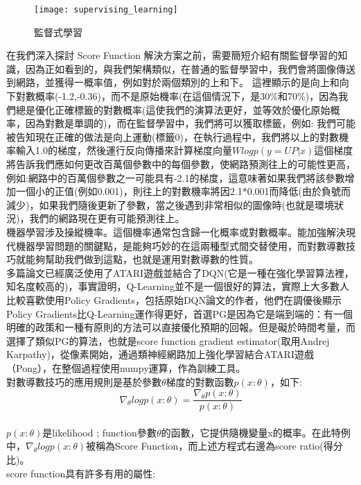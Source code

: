 \begin{figure}[hbt!]
\begin{center}
\texttt{[image: supervising\_learning]}
\caption{監督式學習}
\end{center}
\end{figure}

 在我們深入探討 Score Function 解決方案之前，需要簡短介紹有關監督學習的知識，因為正如看到的，與我們架構類似，在普通的監督學習中，我們會將圖像傳送到網路，並獲得一概率值，例如對於兩個類別的上和下。 這裡顯示的是向上和向下對數概率(-1.2,-0.36)，而不是原始機率(在這個情況下，是30$\%$和70$\%$)，因為我們總是優化正確標籤的對數概率(這使我們的演算法更好，並等效於優化原始概率，因為對數是單調的)，而在監督學習中，我們將可以獲取標籤，例如:
我們可能被告知現在正確的做法是向上運動(標籤0)，在執行過程中，我們將以上的對數機率輸入1.0的梯度，然後運行反向傳播來計算梯度向量$Wlogp(y=UP|x)$這個梯度將告訴我們應如何更改百萬個參數中的每個參數，使網路預測往上的可能性更高，例如:網路中的百萬個參數之一可能具有-2.1的梯度，這意味著如果我們將該參數增加一個小的正值(例如0.001)，則往上的對數機率將因2.1*0.001而降低(由於負號而減少)，如果我們隨後更新了參數，當之後遇到非常相似的圖像時(也就是環境狀況)，我們的網路現在更有可能預測往上。\\

 機器學習涉及操縱機率。這個機率通常包含歸一化概率或對數概率。能加強解決現代機器學習問題的關鍵點，是能夠巧妙的在這兩種型式間交替使用，而對數導數技巧就能夠幫助我們做到這點，也就是運用對數導數的性質。\\
 
 多篇論文已經廣泛使用了ATARI遊戲並結合了DQN(它是一種在強化學習算法裡，知名度較高的)，事實證明，Q-Learning並不是一個很好的算法，實際上大多數人比較喜歡使用Policy Gradients，包括原始DQN論文的作者，他們在調優後顯示Policy Gradients比Q-Learning運作得更好，首選PG是因為它是端到端的：有一個明確的政策和一種有原則的方法可以直接優化預期的回報。但是礙於時間考量，而選擇了類似PG的算法，也就是score function gradient estimator(取用Andrej Karpathy)，從像素開始，通過類神經網路加上強化學習結合ATARI遊戲（Pong），在整個過程使用numpy運算，作為訓練工具。\\ 
 
 對數導數技巧的應用規則是基於參數$\theta$梯度的對數函數$p(x:\theta)$，如下:\\
$$\nabla_\theta logp(x:\theta)=\frac{\nabla_\theta p(x:\theta)}{p(x:\theta)}$$\\
$p(x:\theta)$是likelihood ; function參數$\theta$的函數，它提供隨機變量x的概率。在此特例中，$\nabla_\theta logp(x:\theta)$被稱為Score Function，而上述方程式右邊為score ratio(得分比)。\\
score function具有許多有用的屬性:\\

